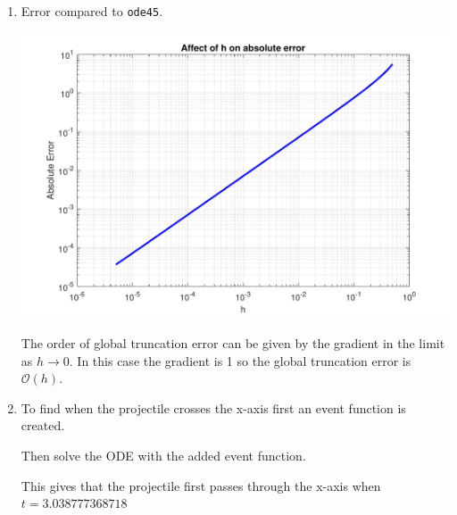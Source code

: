 \documentclass[a4paper,11pt]{article}
\newcommand{\order}{\mathcal{O}}
\begin{document}
\begin{enumerate}
	
	\item Error compared to \verb*|ode45|.
	\begin{center}
		\includegraphics[scale=0.7]{images/Q3d.pdf}
	\end{center}
	The order of global truncation error can be given by the gradient in the 
	limit as $h \xrightarrow{} 0$. In this case the gradient is 1 so the 
	global truncation error is $\order(h)$.
	
	\item To find when the projectile crosses the x-axis first an event 
	function is created.
	
	Then solve the ODE with the added event function.
	
	This gives that the projectile first passes through the x-axis when 
	$t=3.038777368718$
	

\end{enumerate}
\end{document}
